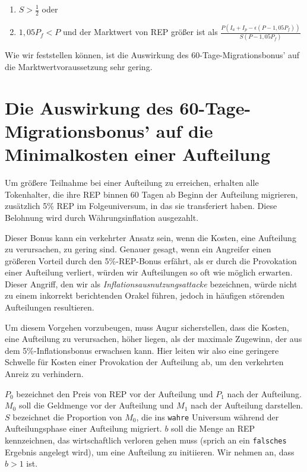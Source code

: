 \documentclass[floatfix,reprint,nofootinbib,amsmath,amssymb,epsfig,pre,floats,letterpaper,groupedaffiliation]{revtex4-1}
\theoremstyle{definition}
\theoremstyle{definition}
\theoremstyle{definition}
\begin{document}
\begin{appendix}
\begin{enumerate}
\item{$S > \frac{1}{2}$ oder}
\item{$1,05P_f < P$ und der Marktwert von REP größer ist als $\frac{P(I_a + I_p - \epsilon(P - 1,05P_f))}{S(P - 1,05P_f)}$}
\end{enumerate}

Wie wir feststellen können, ist die Auswirkung des 60-Tage-Migrationsbonus' auf die Marktwertvoraussetzung sehr gering.

\section{Die Auswirkung des 60-Tage-Migrationsbonus' auf die Minimalkosten einer Aufteilung}

Um größere Teilnahme bei einer Aufteilung zu erreichen, erhalten alle Tokenhalter, die ihre REP binnen 60 Tagen ab Beginn der Aufteilung migrieren, zusätzlich 5\% REP im Folgeuniversum, in das sie transferiert haben. Diese Belohnung wird durch Währungsinflation ausgezahlt.

Dieser Bonus kann ein verkehrter Ansatz sein, wenn die Kosten, eine Aufteilung zu verursachen, zu gering sind. Genauer gesagt, wenn ein Angreifer einen größeren Vorteil durch den 5\%-REP-Bonus erfährt, als er durch die Provokation einer Aufteilung verliert, würden wir Aufteilungen so oft wie möglich erwarten. Dieser Angriff, den wir als \emph{Inflationsausnutzungsattacke} bezeichnen, würde nicht zu einem inkorrekt berichtenden Orakel führen, jedoch in häufigen störenden Aufteilungen resultieren.

Um diesem Vorgehen vorzubeugen, muss Augur sicherstellen, dass die Kosten, eine Aufteilung zu verursachen, höher liegen, als der maximale Zugewinn, der aus dem 5\%-Inflationsbonus erwachsen kann. Hier leiten wir also eine geringere Schwelle für Kosten einer Provokation der Aufteilung ab, um den verkehrten Anreiz zu verhindern.

$P_0$ bezeichnet den Preis von REP vor der Aufteilung und $P_1$ nach der Aufteilung. $M_0$ soll die Geldmenge vor der Aufteilung und $M_1$ nach der Aufteilung darstellen. $S$ bezeichnet die Proportion von $M_0$, die ins \texttt{wahre} Universum während der Aufteilungsphase einer Aufteilung migriert. $b$ soll die Menge an REP kennzeichnen, das wirtschaftlich verloren gehen muss (sprich an ein \texttt{falsches} Ergebnis angelegt wird), um eine Aufteilung zu initiieren. Wir nehmen an, dass $b > 1$ ist.


\end{appendix}
\end{document}
